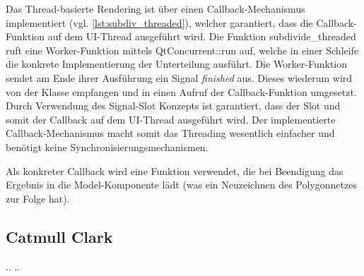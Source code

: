 Das Thread-basierte Rendering ist über einen Callback-Mechanismus implementiert (vgl. \autoref{lst:subdiv_threaded}), welcher garantiert, dass die Callback-Funktion auf dem UI-Thread ausgeführt wird.
Die Funktion subdivide\_threaded ruft eine Worker-Funktion mittels QtConcurrent::run auf, welche in einer Schleife die konkrete Implementierung der Unterteilung ausführt.
Die Worker-Funktion sendet am Ende ihrer Ausführung ein Signal \emph{finished} aus.
Dieses wiederum wird von der Klasse empfangen und in einen Aufruf der Callback-Funktion umgesetzt.
Durch Verwendung des Signal-Slot Konzepts ist garantiert, dass der Slot und somit der Callback auf dem UI-Thread ausgeführt wird.
Der implementierte Callback-Mechanismus macht somit das Threading wesentlich einfacher und benötigt keine Synchronisierungsmechanismen.

Als konkreter Callback wird eine Funktion verwendet, die bei Beendigung das Ergebnis in die Model-Komponente lädt (was ein Neuzeichnen des Polygonnetzes zur Folge hat).

\subsection{Catmull Clark}
..
..



















